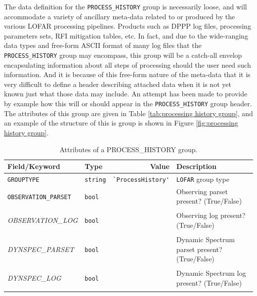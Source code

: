 \documentclass[a4paper,10pt,bibtotoc]{scrartcl}
\begin{document}
The data definition for the \texttt{PROCESS\_HISTORY} group 
is necessarily loose, and will accommodate a variety of ancillary
meta-data related to or produced by the various LOFAR processing
pipelines. Products such as DPPP log files, processing parameters
sets, RFI mitigation tables, etc. In fact, and due to the wide-ranging data types
and free-form ASCII format of many log files that the
\texttt{PROCESS\_HISTORY} group may encompass, this group will be a
catch-all envelop encapsulating information about all steps of
processing should the user need such information. And it is because
of this free-form nature of the meta-data that it is very difficult to
define a header describing attached data when it is not yet known just
what those data may include. An attempt has been made to provide by
example how this will or should appear in the \texttt{PROCESS\_HISTORY}
group header. The attributes of this group are given in Table
\ref{tab:processing history 
group}, and an example of the structure of this is group is shown in Figure \ref{fig:processing history group}.

\begin{table}[htbp]
  \centering
  \begin{tabular}{|llrp{7cm}|}
    \hline 
    \sc Field/Keyword  & \sc Type     & \sc Value & \sc Description \\
    \hline \hline 
     \small\verb|GROUPTYPE|        & \verb|string| &
     \small\verb|`ProcessHistory'| & \small{\verb|LOFAR|} group type \\
     \small\verb|OBSERVATION_PARSET|        & \verb|bool| &  & Observing parset present? (True/False) \\
     \begin{scriptsize}\textit{OBSERVATION\_LOG}\end{scriptsize}     & \verb|bool|      &            & Observing log present? (True/False) \\
     \begin{scriptsize}\textit{DYNSPEC\_PARSET}\end{scriptsize}      & \verb|bool|  &  & Dynamic Spectrum parset present? 
     									(True/False) \\
     \begin{scriptsize}\textit{DYNSPEC\_LOG}\end{scriptsize} & \verb|bool|  &  & Dynamic Spectrum log present? 
     									(True/False) \\
    \hline
  \end{tabular}
  \caption{Attributes of a PROCESS\_HISTORY group.}
  \label{tab:processing history group}
\end{table}
\end{document}
